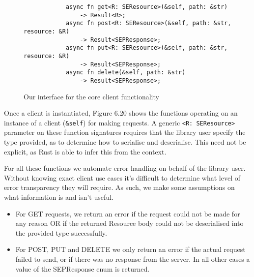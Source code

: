 \begin{figure}[h]
    \begin{center}
        \begin{lstlisting}
            async fn get<R: SEResource>(&self, path: &str) 
                -> Result<R>;
            async fn post<R: SEResource>(&self, path: &str, resource: &R) 
                -> Result<SEPResponse>;
            async fn put<R: SEResource>(&self, path: &str, resource: &R) 
                -> Result<SEPResponse>;
            async fn delete(&self, path: &str) 
                -> Result<SEPResponse>;
        \end{lstlisting}
        \label{fig:clientrequestinterface}
        \vspace{-10pt}
        \caption{Our interface for the core client functionality}
    \end{center}
\end{figure}

Once a client is instantiated, Figure 6.20 shows the functions operating on an instance of a client (\texttt{\&self}) for making requests. A generic \texttt{<R: SEResource>} parameter on these function signatures requires that the library user specify the type provided, as to determine how to serialise and deserialise. This need not be explicit, as Rust is able to infer this from the context.

For all these functions we automate error handling on behalf of the library user. Without knowing exact client use cases it's difficult to determine what level of error transparency they will require. As such, we make some assumptions on what information is and isn't useful.

\begin{itemize}
    \item For GET requests, we return an error if the request could not be made for any reason OR if the returned Resource body could not be deserialised into the provided type successfully.
    \item For POST, PUT and DELETE we only return an error if the actual request failed to send, or if there was no response from the server. In all other cases a value of the SEPResponse enum is returned.
\end{itemize}

